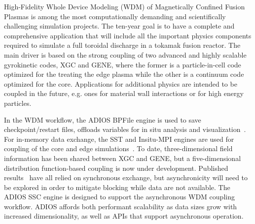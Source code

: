 \documentclass[x11names,table,xcdraw,graybox]{svmult}
\begin{document}

High-Fidelity Whole Device Modeling (WDM) of Magnetically Confined Fusion Plasmas is among the most computationally demanding and scientifically challenging simulation projects.
The ten-year goal is to have a complete and comprehensive application
that will include all the important physics components required to
simulate a full toroidal discharge in a tokamak fusion reactor.
The main driver is based on the strong coupling of two advanced and
highly scalable gyrokinetic codes, XGC and GENE, where the former is a
particle-in-cell code optimized for the treating the edge plasma while
the other is a continuum code optimized for the core.
Applications for additional physics are intended
to be coupled in the future, e.g. ones for material wall interactions or
for high energy particles.

In the WDM workflow, the ADIOS BPFile engine is used to save checkpoint/restart files,
offloads variables for in situ analysis and
visualization~\cite{escience2018}.
For in-memory data exchange, the SST and Insitu-MPI engines are used for coupling of the core and edge simulations~\cite{dominski2018}.
To date, three-dimensional field information has been
shared between XGC and GENE, but a five-dimensional distribution
function-based coupling is now under development. Published results~\cite{escience2018, dominski2018}
have all relied on synchronous exchange, but asynchronicity will need to
be explored in order to mitigate blocking while data are not available. The ADIOS SSC engine is designed to support the asynchronous WDM coupling workflow.
ADIOS affords both performant scalability as data sizes grow with
increased dimensionality, as well as APIs that support asynchronous
operation.
\end{document}
